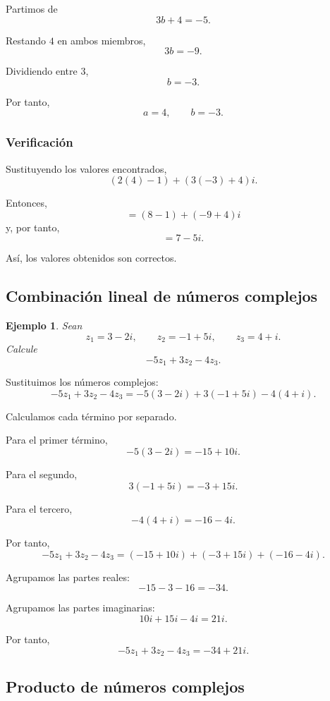 \documentclass[12pt]{article}
\newtheorem{Ejem}{Ejemplo}
\begin{document}
Partimos de
\[
3b+4=-5.
\]

Restando $4$ en ambos miembros,
\[
3b=-9.
\]

Dividiendo entre $3$,
\[
\boxed{b=-3}.
\]

Por tanto,
\[
\boxed{
a=4,\qquad b=-3
}.
\]

\subsubsection*{Verificación}

Sustituyendo los valores encontrados,
\[
(2(4)-1)+(3(-3)+4)i.
\]

Entonces,
\[
=(8-1)+(-9+4)i
\]
y, por tanto,
\[
=7-5i.
\]

Así, los valores obtenidos son correctos.

\subsection{Combinación lineal de números complejos}

\begin{Ejem}
Sean
\[
z_1=3-2i,\qquad
z_2=-1+5i,\qquad
z_3=4+i.
\]
Calcule
\[
-5z_1+3z_2-4z_3.
\]
\end{Ejem}

Sustituimos los números complejos:
\[
-5z_1+3z_2-4z_3
=
-5(3-2i)+3(-1+5i)-4(4+i).
\]

Calculamos cada término por separado.

Para el primer término,
\[
-5(3-2i)
=
-15+10i.
\]

Para el segundo,
\[
3(-1+5i)
=
-3+15i.
\]

Para el tercero,
\[
-4(4+i)
=
-16-4i.
\]

Por tanto,
\[
-5z_1+3z_2-4z_3
=
(-15+10i)+(-3+15i)+(-16-4i).
\]

Agrupamos las partes reales:
\[
-15-3-16=-34.
\]

Agrupamos las partes imaginarias:
\[
10i+15i-4i=21i.
\]

Por tanto,
\[
\boxed{
-5z_1+3z_2-4z_3=-34+21i
}.
\]

\subsection{Producto de números complejos}
\end{document}
